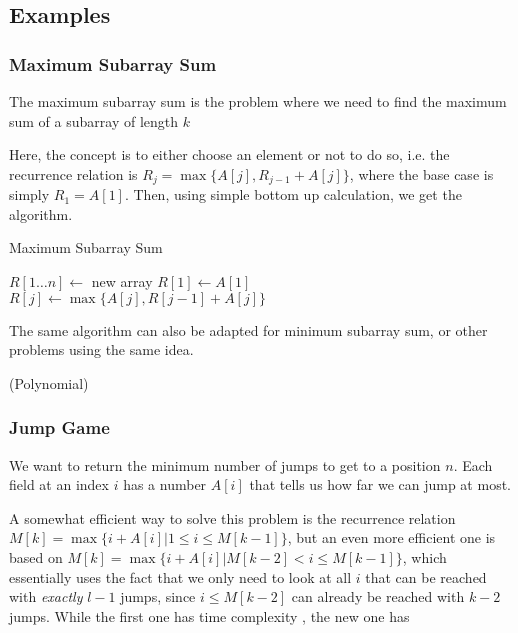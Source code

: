 \subsection{Examples}
\subsubsection{Maximum Subarray Sum}
The maximum subarray sum is the problem where we need to find the maximum sum of a subarray of length $k$

Here, the concept is to either choose an element or not to do so, i.e. the recurrence relation is $R_j = \max \{A[j], R_{j - 1} + A[j]\}$, where the base case is simply $R_1 = A[1]$. Then, using simple bottom up calculation, we get the algorithm.

\begin{algorithm}
    \begin{spacing}{1.2}
        \caption{Maximum Subarray Sum}
        \begin{algorithmic}[1]
            \State $R[1\ldots n] \gets$ new array
            \State $R[1] \gets A[1]$
                \State $R[j] \gets \max\{A[j], R[j - 1] + A[j]\}$
            \EndFor
        \end{algorithmic}
    \end{spacing}
\end{algorithm}

The same algorithm can also be adapted for minimum subarray sum, or other problems using the same idea.

\timecomplexity {} (Polynomial)


\subsubsection{Jump Game}
We want to return the minimum number of jumps to get to a position $n$. Each field at an index $i$ has a number $A[i]$ that tells us how far we can jump at most. 

A somewhat efficient way to solve this problem is the recurrence relation $M[k] = \max\{i + A[i] | 1 \leq i \leq M[k - 1]\}$, but an even more efficient one is based on $M[k] = \max \{i + A[i] | M[k - 2] < i \leq M[k - 1]\}$, which essentially uses the fact that we only need to look at all $i$ that can be reached with \textit{exactly} $l - 1$ jumps, since $i \leq M[k - 2]$ can already be reached with $k - 2$ jumps. While the first one has time complexity , the new one has 


